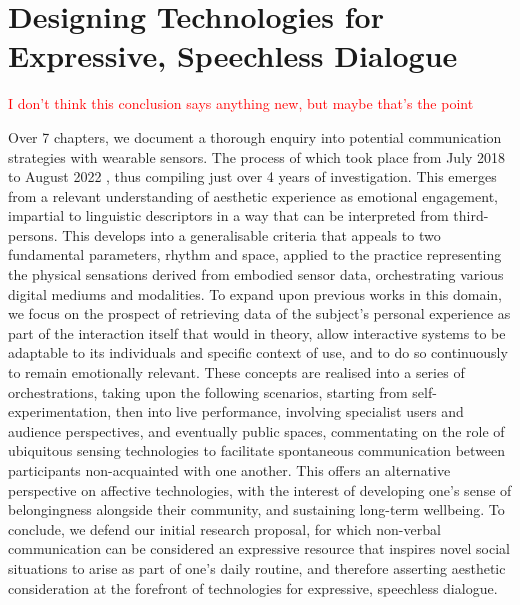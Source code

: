 \section{Designing Technologies for Expressive, Speechless Dialogue}
\textcolor{red}{I don't think this conclusion says anything new, but maybe that's the point}

Over 7 chapters, we document a thorough enquiry into potential communication strategies with wearable sensors. The process of which took place from July 2018 to August 2022
, thus compiling just over 4 years of investigation. This emerges from a relevant understanding of aesthetic experience as emotional engagement, impartial to linguistic descriptors in a way that can be interpreted from third-persons. This develops into a generalisable criteria that appeals to two fundamental parameters, rhythm and space, applied to the practice representing the physical sensations derived from embodied sensor data, orchestrating various digital mediums and modalities. To expand upon previous works in this domain, we focus on the prospect of retrieving data of the subject's personal experience as part of the interaction itself that would in theory, allow interactive systems to be adaptable to its individuals and specific context of use, and to do so continuously to remain emotionally relevant. These concepts are realised into a series of orchestrations, taking upon the following scenarios, starting from self-experimentation, then into live performance, involving specialist users and audience perspectives, and eventually public spaces, commentating on the role of ubiquitous sensing technologies to facilitate spontaneous communication between participants non-acquainted with one another. This offers an alternative perspective on affective technologies, with the interest of developing one's sense of belongingness alongside their community, and sustaining long-term wellbeing. To conclude, we defend our initial research proposal, for which non-verbal communication can be considered an expressive resource that inspires novel social situations to arise as part of one's daily routine, and therefore asserting aesthetic consideration at the forefront of technologies for expressive, speechless dialogue.

\begin{quote}

\end{quote}


